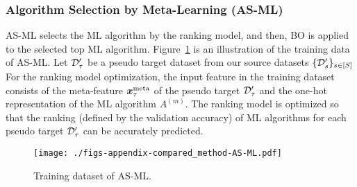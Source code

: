 

\subsubsection{Algorithm Selection by Meta-Learning (AS-ML)}
\label{ssapp:AS-ML}


AS-ML selects the ML algorithm by the ranking model, and then, BO is applied to the selected top ML algorithm. 
%
Figure~\ref{fig:AS-ML} is an illustration of the training data of AS-ML.
%
Let ${\mathcal D}_\tau^\prime$ be a pseudo target dataset from our source datasets $\{ {\mathcal D}_s^\prime \}_{s \in [S]}$
% 
For the ranking model optimization, the input feature in the training dataset consists of the meta-feature 
$\boldsymbol{x}_\tau^{\rm meta}$
of the pseudo target
${\mathcal D}_\tau^\prime$
and the one-hot representation of the ML algorithm 
$A^{(m)}$.
%
The ranking model is optimized so that the ranking (defined by the validation accuracy) of ML algorithms for each pseudo target
${\mathcal D}_\tau^\prime$
can be accurately predicted.




\begin{figure}[t]
  \centering
  \texttt{[image: ./figs-appendix-compared\_method-AS-ML.pdf]}
  \caption{Training dataset of AS-ML.}
  \label{fig:AS-ML}
\end{figure}



